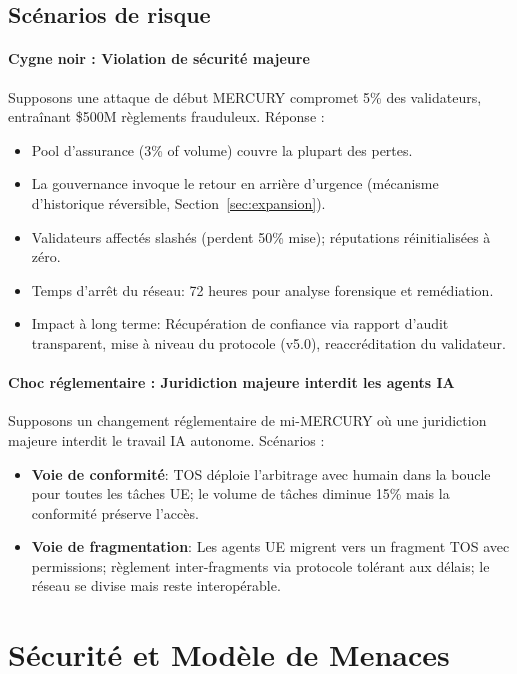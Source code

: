 \documentclass[11pt]{article}
\begin{document}
\subsection{Scénarios de risque}
\paragraph{Cygne noir : Violation de sécurité majeure}
Supposons une attaque de début MERCURY compromet 5\% des validateurs, entraînant \$500M règlements frauduleux. Réponse :
\begin{itemize}[noitemsep]
  \item Pool d'assurance (3\% of volume) couvre la plupart des pertes.
  \item La gouvernance invoque le retour en arrière d'urgence (mécanisme d'historique réversible, Section~\ref{sec:expansion}).
  \item Validateurs affectés slashés (perdent 50\% mise); réputations réinitialisées à zéro.
  \item Temps d'arrêt du réseau: 72 heures pour analyse forensique et remédiation.
  \item Impact à long terme: Récupération de confiance via rapport d'audit transparent, mise à niveau du protocole (v5.0), reaccréditation du validateur.
\end{itemize}

\paragraph{Choc réglementaire : Juridiction majeure interdit les agents IA}
Supposons un changement réglementaire de mi-MERCURY où une juridiction majeure interdit le travail IA autonome. Scénarios :
\begin{itemize}[noitemsep]
  \item \textbf{Voie de conformité}: TOS déploie l'arbitrage avec humain dans la boucle pour toutes les tâches UE; le volume de tâches diminue 15\% mais la conformité préserve l'accès.
  \item \textbf{Voie de fragmentation}: Les agents UE migrent vers un fragment TOS avec permissions; règlement inter-fragments via protocole tolérant aux délais; le réseau se divise mais reste interopérable.
\end{itemize}

\section{Sécurité et Modèle de Menaces}
\label{sec:security}
\end{document}
